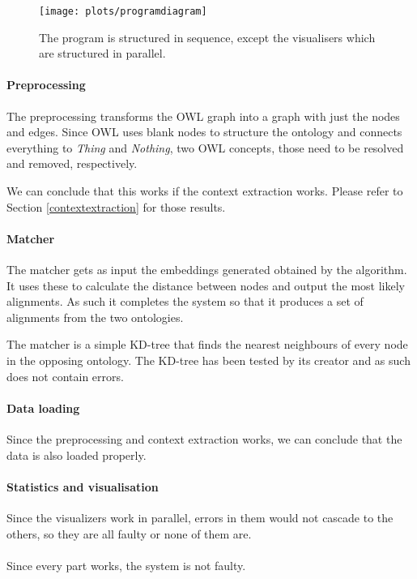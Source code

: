 \documentclass{article}
\begin{document}
  \begin{figure}[H]
  \centering
  \texttt{[image: plots/programdiagram]}
  \label{program}
  \caption[Program diagram]{The program is structured in sequence, except the visualisers which are structured in parallel.}
  \end{figure}
  
  \paragraph{Preprocessing} \label{preprocessing}
  The preprocessing transforms the OWL graph into a graph with just the nodes and edges. Since OWL uses blank nodes to structure the ontology and connects everything to \textit{Thing} and \textit{Nothing}, two OWL concepts, those need to be resolved and removed, respectively.
  
  We can conclude that this works if the context extraction works. Please refer to Section \ref{contextextraction} for those results.
  \paragraph{Matcher} The matcher gets as input the embeddings generated obtained by the algorithm. It uses these to calculate the distance between nodes and output the most likely alignments. As such it completes the system so that it produces a set of alignments from the two ontologies.
  
  The matcher is a simple KD-tree that finds the nearest neighbours of every node in the opposing ontology. The KD-tree has been tested by its creator and as such does not contain errors.
  \paragraph{Data loading}
  Since the preprocessing and context extraction works, we can conclude that the data is also loaded properly.
  \paragraph{Statistics and visualisation}
  Since the visualizers work in parallel, errors in them would not cascade to the others, so they are all faulty or none of them are.
  \paragraph{}
  Since every part works, the system is not faulty. %
  
\end{document}
